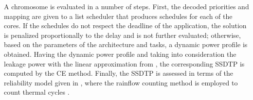 A chromosome is evaluated in a number of steps. First, the decoded priorities and mapping are given to a list scheduler that produces schedules for each of the cores. If the schedules do not respect the deadline of the application, the solution is penalized proportionally to the delay and is not further evaluated; otherwise, based on the parameters of the architecture and tasks, a dynamic power profile is obtained. Having the dynamic power profile and taking into consideration the leakage power with the linear approximation from , the corresponding SSDTP is computed by the CE method. Finally, the SSDTP is assessed in terms of the reliability model given in , where the rainflow counting method is employed to count thermal cycles \cite{xiang2010}.
